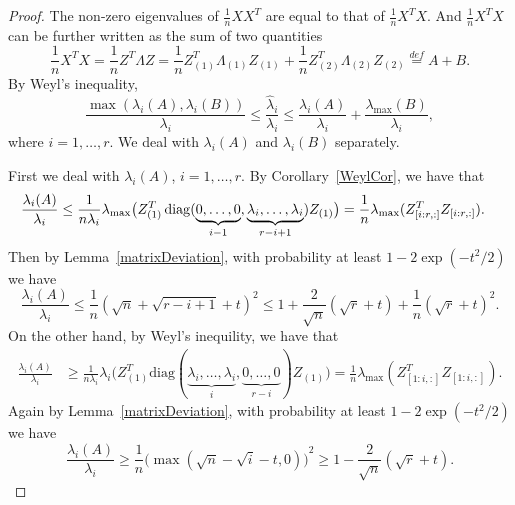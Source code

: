 \begin{proof}
    The non-zero eigenvalues of $\frac{1}{n}XX^T$ are equal to that of $\frac{1}{n}X^T X$.
    And $\frac{1}{n}X^T X$ can be further written as the sum of two quantities
    \begin{equation*}
        \frac{1}{n}X^T X=\frac{1}{n}Z^T \Lambda Z=\frac{1}{n}Z_{(1)}^T \Lambda_{(1)} Z_{(1)} +\frac{1}{n}Z_{(2)}^T \Lambda_{(2)} Z_{(2)} \overset{def}{=}A+B.
    \end{equation*}
    By Weyl's inequality,
    \begin{equation}\label{PCA19}
        \frac{\max(\lambda_i(A),\lambda_i(B))}{\lambda_i}\leq\frac{\hat{\lambda}_i}{\lambda_i}\leq \frac{\lambda_i(A)}{\lambda_i} +\frac{\lambda_{\max}(B)}{\lambda_i},
    \end{equation}
    where $i=1,\ldots, r$. We deal with $\lambda_i(A)$ and $\lambda_i(B)$ separately.

    First we deal with ${\lambda_i(A)}$, $ i=1,\ldots, r$.
    By Corollary~\ref{WeylCor}, we have that
    \begin{equation*}
        \begin{aligned}
            \frac{\lambda_i(A)}{\lambda_i}&\leq
            \frac{1}{n\lambda_i}\lambda_{\max}\big(Z_{(1)}^T \operatorname{diag}(\underbrace{0,\ldots,0}_{i-1},\underbrace{\lambda_i,\ldots,\lambda_i}_{r-i+1}) Z_{(1)} \big)
            =\frac{1}{n}\lambda_{\max}(Z_{[i:r,:]}^T Z_{[i:r,:]}).
        \end{aligned}
    \end{equation*}
    Then by Lemma~\ref{matrixDeviation}, with probability at least $1-2\exp(-t^2/2)$ we have 
    \begin{equation}\label{eigenvalueTheorem:2}
    \frac{\lambda_i(A)}{\lambda_i}\leq
    \frac{1}{n}{(\sqrt{n}+\sqrt{r-i+1}+t)}^2
    \leq
    1+\frac{2}{\sqrt{n}}(\sqrt{r}+t)+\frac{1}{n}(\sqrt{r}+t)^2.
\end{equation}
    On the other hand, by Weyl's inequility, we have that
\begin{equation*}
    \begin{aligned}
        \frac{\lambda_i(A)}{\lambda_i}&\geq
        \frac{1}{n\lambda_i}\lambda_{i}\big(Z_{(1)}^T \mathrm{diag}(\underbrace{\lambda_i,\ldots,\lambda_i}_{i},\underbrace{0,\ldots,0}_{r-i}) Z_{(1)} \big)
            =\frac{1}{n}\lambda_{\max}(Z_{[1:i,:]}^T Z_{[1:i,:]}).
    \end{aligned}
\end{equation*}
    Again by Lemma~\ref{matrixDeviation}, with probability at least $1-2\exp(-t^2/2)$ we have 
\begin{equation}\label{eigenvalueTheorem:3}
        \frac{\lambda_i(A)}{\lambda_i}\geq
        \frac{1}{n}{\big(\max(\sqrt{n}-\sqrt{i}-t,0)\big)}^2
        \geq 1-\frac{2}{\sqrt{n}}(\sqrt{r}+t).
\end{equation}


\end{proof}
